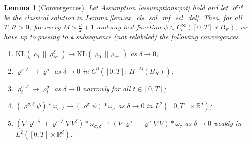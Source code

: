 \documentclass[reqno, 11pt]{amsart}
\numberwithin{equation}{section}
\newtheorem{lem}[thm]{Lemma}
\theoremstyle{definition}
\begin{document}
\begin{lem}[Convergences]
    \label{lem:conv_mf_scl_del}
    Let Assumption \ref{assumptions:pot} hold and let $\varrho^{\sigma,\delta}$ be the classical solution in Lemma \ref{lem:ex_cls_sol_mf_scl_del}. Then, for all $T, R>0$, for every $M>\frac{d}{2}+1$ and any test function $\psi\in C_c^\infty([0,T]\times B_R)$, we have up to passing to a subsequence (not relabeled) the following convergences
    \begin{enumerate}[label=(\roman*)]
        \item\label{conv:init_varrho} $\mathrm{KL}(\varrho_0\,||\,\varrho_\infty^\delta)\rightarrow \mathrm{KL}(\varrho_0 \,||\,\varrho_\infty)$ as $\delta\rightarrow 0$;
        
        \item\label{conv:varrho_scl_del_hm} $\varrho^{\sigma,\delta}\rightarrow\varrho^\sigma$ as $\delta\rightarrow 0$ in $C^0([0,T];\, H^{-M}(B_R))$;
        
        \item\label{conv:varrho_scl_del_pro} $\varrho_t^{\sigma,\delta}\rightarrow\varrho_t^\sigma$ as $\delta\rightarrow 0$ narrowly for all $t\in[0,T]$;
        \item\label{conv:varrho_scl_del_strong} $(\varrho^{\sigma,\delta} \psi)\ast\omega_{\sigma,\delta}\rightarrow(\varrho^\sigma\psi)\ast\omega_\sigma$ as $\delta\rightarrow 0$ in $L^2([0,T]\times \mathbb{R}^{d})$;
        \item\label{conv:varrho_scl_del_weak} $(\nabla\varrho^{\sigma,\delta}+\varrho^{\sigma,\delta}\nabla V^\delta)\ast\omega_{\sigma,\delta}\rightharpoonup(\nabla\varrho^\sigma+\varrho^\sigma\nabla V)\ast\omega_\sigma$ as $\delta\rightarrow 0$ weakly in $L^2([0,T]\times \mathbb{R}^{d})$.
    \end{enumerate}
\end{lem}
\end{document}
